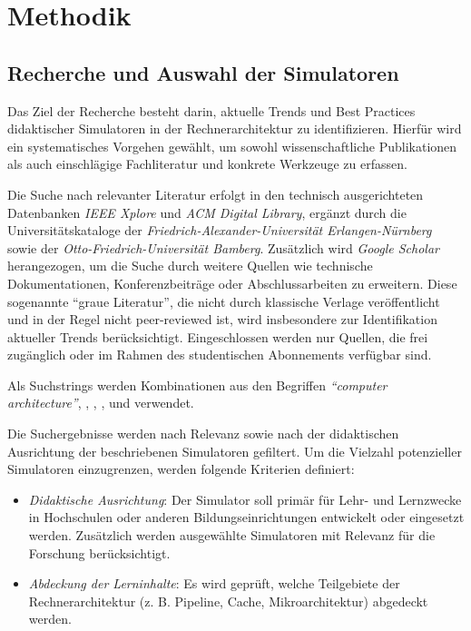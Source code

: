 \chapter{Methodik}

\section{Recherche und Auswahl der Simulatoren}

Das Ziel der Recherche besteht darin, aktuelle Trends und Best Practices didaktischer Simulatoren in der Rechnerarchitektur zu identifizieren. Hierfür wird ein systematisches Vorgehen gewählt, um sowohl wissenschaftliche Publikationen als auch einschlägige Fachliteratur und konkrete Werkzeuge zu erfassen.

Die Suche nach relevanter Literatur erfolgt in den technisch ausgerichteten Datenbanken \textit{IEEE Xplore} und \textit{ACM Digital Library}, ergänzt durch die Universitätskataloge der \textit{Friedrich-Alexander-Universität Erlangen-Nürnberg} sowie der \textit{Otto-Friedrich-Universität Bamberg}. Zusätzlich wird \textit{Google Scholar} herangezogen, um die Suche durch weitere Quellen wie technische Dokumentationen, Konferenzbeiträge oder Abschlussarbeiten zu erweitern. Diese sogenannte \enquote{graue Literatur}, die nicht durch klassische Verlage veröffentlicht und in der Regel nicht peer-reviewed ist, wird insbesondere zur Identifikation aktueller Trends berücksichtigt. Eingeschlossen werden nur Quellen, die frei zugänglich oder im Rahmen des studentischen Abonnements verfügbar sind.

Als Suchstrings werden Kombinationen aus den Begriffen \textit{\enquote{computer architecture}}, \textit{}, \textit{}, \textit{}, \textit{} und \textit{} verwendet.

Die Suchergebnisse werden nach Relevanz sowie nach der didaktischen Ausrichtung der beschriebenen Simulatoren gefiltert. Um die Vielzahl potenzieller Simulatoren einzugrenzen, werden folgende Kriterien definiert:

\begin{itemize}
  \item \textit{Didaktische Ausrichtung}: Der Simulator soll primär für Lehr- und Lernzwecke in Hochschulen oder anderen Bildungseinrichtungen entwickelt oder eingesetzt werden. Zusätzlich werden ausgewählte Simulatoren mit Relevanz für die Forschung berücksichtigt.
  \item \textit{Abdeckung der Lerninhalte}: Es wird geprüft, welche Teilgebiete der Rechnerarchitektur (z. B. Pipeline, Cache, Mikroarchitektur) abgedeckt werden.
\end{itemize}

